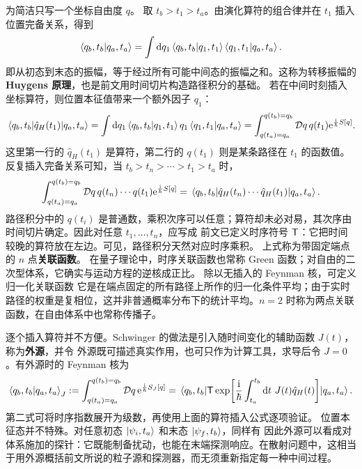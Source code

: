 为简洁只写一个坐标自由度 $q$。
取 $t_b>t_1>t_a$。由演化算符的组合律并在 $t_1$ 插入位置完备关系，得到
\[
    \ip{q_b,t_b}{q_a,t_a}
    =\int\d{q_1}
    \ip{q_b,t_b}{q_1,t_1}\ip{q_1,t_1}{q_a,t_a}.
\]
即从初态到末态的振幅，等于经过所有可能中间态的振幅之和。这称为转移振幅的\textbf{Huygens 原理}，也是前文用时间切片构造路径积分的基础。
若在中间时刻插入坐标算符，则位置本征值带来一个额外因子 $q_1$：
\[
    \mel{q_b,t_b}{\hat q_H(t_1)}{q_a,t_a}
    =\int\d{q_1}
    \ip{q_b,t_b}{q_1,t_1}q_1\ip{q_1,t_1}{q_a,t_a}=\int_{q(t_a)=q_a}^{q(t_b)=q_b}\mathcal Dq\,
    q(t_1)\e^{\frac{\i}{\hbar}S[q]}.
\]
这里第一行的 $\hat q_H(t_1)$ 是算符，第二行的 $q(t_1)$ 则是某条路径在 $t_1$ 的函数值。反复插入完备关系可知，当 $t_b>t_n>\cdots>t_1>t_a$ 时，
\[
    \int_{q(t_a)=q_a}^{q(t_b)=q_b}\mathcal Dq\,
    q(t_n)\cdots q(t_1)\mathrm{e}^{\frac{\mathrm{i}}{\hbar}S[q]}
    =\mel{q_b,t_b}{\hat q_H(t_n)\cdots\hat q_H(t_1)}{q_a,t_a}.
\]
路径积分中的 $q(t_i)$ 是普通数，乘积次序可以任意；算符却未必对易，其次序由时间切片确定。因此对任意 $t_1,\ldots,t_n$，应写成
前文已定义时序符号 $\mathsf{T}$：它把时间较晚的算符放在左边。可见，路径积分天然对应时序乘积。
上式称为带固定端点的 $n$ 点\textbf{关联函数}。
在量子理论中，时序关联函数也常称 Green 函数；对自由的二次型体系，它确实与运动方程的逆核成正比。
除以无插入的 Feynman 核，可定义归一化关联函数
它是在端点固定的所有路径上所作的归一化条件平均；由于实时路径的权重是复相位，这并非普通概率分布下的统计平均。$n=2$ 时称为两点关联函数，在自由体系中也常称传播子。

逐个插入算符并不方便。Schwinger 的做法是引入随时间变化的辅助函数 $J(t)$，称为\textbf{外源}，并令
外源既可描述真实作用，也可只作为计算工具，求导后令 $J=0$。有外源时的 Feynman 核为
\[
    \ip{q_b,t_b}{q_a,t_a}_J
    :=\int_{q(t_a)=q_a}^{q(t_b)=q_b}\mathcal Dq\,
    \e^{\frac{\i}{\hbar}S_J[q]}=\mel{q_b,t_b}{\Tord\exp[\frac{\i}{\hbar}
    \int_{t_a}^{t_b}\d{t}\,J(t)\hat q_H(t)]}{q_a,t_a}.
\]
第二式可将时序指数展开为级数，再使用上面的算符插入公式逐项验证。
位置本征态并不特殊。对任意初态 $\ket{\psi_i,t_a}$ 和末态 $\ket{\psi_f,t_b}$，同样有
因此外源可以看成对体系施加的探针：它既能制备扰动，也能在末端探测响应。在散射问题中，这相当于用外源概括前文所说的粒子源和探测器，而无须重新指定每一种中间过程。


